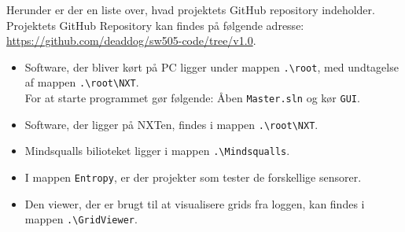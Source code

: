 Herunder er der en liste over, hvad projektets GitHub repository indeholder.
Projektets GitHub Repository kan findes på følgende adresse: \url{https://github.com/deaddog/sw505-code/tree/v1.0}.

\begin{itemize}
\item Software, der bliver kørt på PC ligger under mappen \lstinline[style=c]!.\root!, med undtagelse af mappen \lstinline[style=c]!.\root\NXT!.
\\
For at starte programmet gør følgende:
Åben \lstinline[style=c]!Master.sln! og kør \lstinline[style=c]!GUI!.
\item Software, der ligger på NXTen, findes i mappen \lstinline[style=c]!.\root\NXT!.
\item Mindsqualls bilioteket ligger i mappen \lstinline[style=c]!.\Mindsqualls!.
\item I mappen \lstinline[style=c]!Entropy!, er der projekter som tester de forskellige sensorer.
\item Den viewer, der er brugt til at visualisere grids fra loggen, kan findes i mappen \lstinline[style=c]!.\GridViewer!.

\end{itemize}